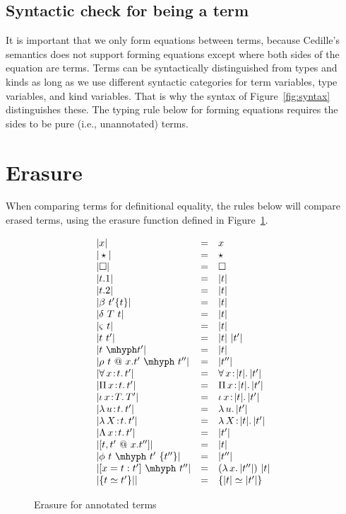 \documentclass{article}
\newcommand{\abs}[4]{{#1}\, #2\! : \! #3.\, #4}
\newcommand{\absu}[3]{{#1}\, #2.\, #3}
\begin{document}
\subsection{Syntactic check for being a term}
\label{sec:termcheck}

It is important that we only form equations between terms, because
Cedille's semantics does not support forming equations except where
both sides of the equation are terms.  Terms can be syntactically
distinguished from types and kinds as long as we use different
syntactic categories for term variables, type variables, and kind
variables.  That is why the syntax of Figure~\ref{fig:syntax}
distinguishes these.  The typing rule below for forming equations
requires the sides to be pure (i.e., unannotated) terms.


\section{Erasure}

When comparing terms for definitional equality, the rules below will
compare erased terms, using the erasure function defined in
Figure~\ref{fig:eraser}.

\begin{figure}
  \[
  \begin{array}{lll}
    |x| & = & x \\
    |\star| & = & \star \\
    |\Box| & = & \Box \\
    |t.1| & = & |t| \\
    |t.2| & = & |t| \\
    |\beta\ t'\{t\}| & = & |t|\\
    |\delta\ T\ t| & = & |t|\\
    |\varsigma\ t| & = & |t| \\
    |t\ t'| & = & |t|\ |t'| \\
    |t\ \mhyph t'| & = & |t| \\
    |\rho\ t\ @\ x.t'\ \mhyph\ t''| & = & |t''| \\
    |\abs{\forall}{x}{t}{t'}| & = & \abs{\forall}{x}{|t|}{|t'|}\\
    |\abs{\Pi}{x}{t}{t'}| & = & \abs{\Pi}{x}{|t|}{|t'|}\\
    |\abs{\iota}{x}{T}{T'}| & = & \abs{\iota}{x}{|t|}{|t'|} \\
    |\abs{\lambda}{u}{t}{t'}| & = &  \absu{\lambda}{u}{|t'|} \\
    |\abs{\lambda}{X}{t}{t'}| & = &  \abs{\lambda}{X}{|t|}{|t'|} \\
    |\abs{\Lambda}{x}{t}{t'}| & = &  |t'| \\ 
    |[ t , t' \ @\ x.t'' ]| & = & |t| \\ 
    |\phi\ t\ \mhyph\ t'\ \{t''\}| & = & |t''| \\
    |[ x = t : t' ]\ \mhyph\ t'' | & = & (\absu{\lambda}{x}{|t''|})\ |t|\\
    |\{ t \simeq t' \}|| & = & \{ |t| \simeq |t'| \}
  \end{array}
  \]
  \caption{Erasure for annotated terms}
  \label{fig:eraser}
\end{figure}  
\end{document}
